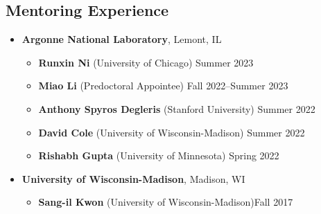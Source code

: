 \documentclass[letterpaper, 11pt]{article}
\begin{document}
\subsection*{Mentoring Experience}
\begin{itemize}[leftmargin=*]
\item[] {\bf Argonne National Laboratory}, Lemont, IL
  \begin{itemize}[leftmargin=*]
  \item[] {\bf Runxin Ni} (University of Chicago) \hfill Summer 2023
  \item[] {\bf Miao Li} (Predoctoral Appointee) \hfill Fall 2022--Summer 2023
  \item[] {\bf Anthony Spyros Degleris} (Stanford University) \hfill Summer 2022
  \item[] {\bf David Cole} (University of Wisconsin-Madison) \hfill Summer 2022
  \item[] {\bf Rishabh Gupta} (University of Minnesota) \hfill Spring 2022
  \end{itemize}
\item[] {\bf University of Wisconsin-Madison}, Madison, WI
  \begin{itemize}[leftmargin=*]
  \item[] {\bf Sang-il Kwon} (University of Wisconsin-Madison)\hfill Fall 2017
  \end{itemize}
\end{itemize}
\end{document}

